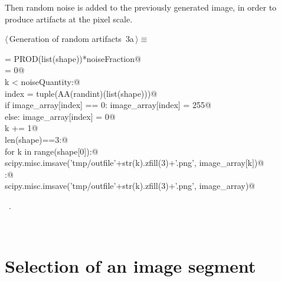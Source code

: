 \documentclass[11pt,oneside]{article}	%
\begin{document}
Then random noise is added to the previously generated image, in order to produce artifacts at the pixel scale. 

\begin{flushleft} \small
\begin{minipage}{\linewidth} \label{scrap3}
\protect{}$\langle\,$Generation of random artifacts\nobreak\ {\footnotesize 3a}$\,\rangle\equiv$
\vspace{-1ex}
\begin{list}{}{} \item
\mbox{}\verb@noiseQuantity = PROD(list(shape))*noiseFraction@\\
\mbox{}\verb@k = 0@\\
\mbox{}\verb@while k < noiseQuantity:@\\
\mbox{}\verb@   index = tuple(AA(randint)(list(shape)))@\\
\mbox{}\verb@   if image_array[index] == 0: image_array[index] = 255@\\
\mbox{}\verb@   else: image_array[index] = 0@\\
\mbox{}\verb@   k += 1@\\
\mbox{}\verb@if len(shape)==3:@\\
\mbox{}\verb@   for k in range(shape[0]):@\\
\mbox{}\verb@      scipy.misc.imsave('tmp/outfile'+str(k).zfill(3)+'.png', image_array[k])@\\
\mbox{}\verb@else:@\\
\mbox{}\verb@   scipy.misc.imsave('tmp/outfile'+str(k).zfill(3)+'.png', image_array)@\\
\mbox{}\verb@@{\NWsep}
\end{list}
\vspace{-1ex}
\footnotesize\addtolength{\baselineskip}{-1ex}
\begin{list}{}{\setlength{\itemsep}{-\parsep}\setlength{\itemindent}{-\leftmargin}}
\item \NWtxtMacroRefIn\ .
\end{list}
\end{minipage}\\[4ex]
\end{flushleft}


\section{Selection of an image segment}
\end{document}
